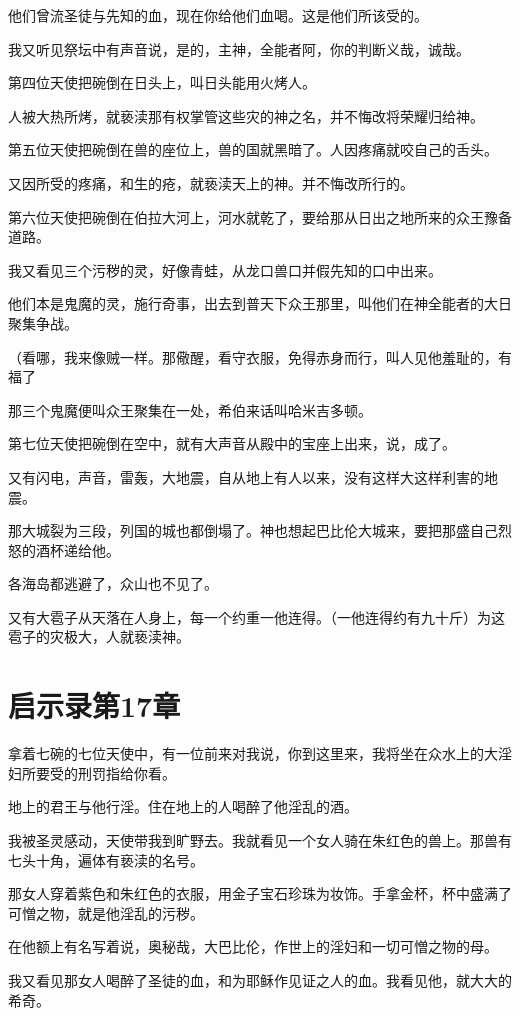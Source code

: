 \documentclass[12pt,oneside]{book}
\begin{document}
他们曾流圣徒与先知的血，现在你给他们血喝。这是他们所该受的。

我又听见祭坛中有声音说，是的，主神，全能者阿，你的判断义哉，诚哉。

第四位天使把碗倒在日头上，叫日头能用火烤人。

人被大热所烤，就亵渎那有权掌管这些灾的神之名，并不悔改将荣耀归给神。

第五位天使把碗倒在兽的座位上，兽的国就黑暗了。人因疼痛就咬自己的舌头。

又因所受的疼痛，和生的疮，就亵渎天上的神。并不悔改所行的。

第六位天使把碗倒在伯拉大河上，河水就乾了，要给那从日出之地所来的众王豫备道路。

我又看见三个污秽的灵，好像青蛙，从龙口兽口并假先知的口中出来。

他们本是鬼魔的灵，施行奇事，出去到普天下众王那里，叫他们在神全能者的大日聚集争战。

（看哪，我来像贼一样。那儆醒，看守衣服，免得赤身而行，叫人见他羞耻的，有福了

那三个鬼魔便叫众王聚集在一处，希伯来话叫哈米吉多顿。

第七位天使把碗倒在空中，就有大声音从殿中的宝座上出来，说，成了。

又有闪电，声音，雷轰，大地震，自从地上有人以来，没有这样大这样利害的地震。

那大城裂为三段，列国的城也都倒塌了。神也想起巴比伦大城来，要把那盛自己烈怒的酒杯递给他。

各海岛都逃避了，众山也不见了。

又有大雹子从天落在人身上，每一个约重一他连得。（一他连得约有九十斤）为这雹子的灾极大，人就亵渎神。

\chapter{启示录第17章}
拿着七碗的七位天使中，有一位前来对我说，你到这里来，我将坐在众水上的大淫妇所要受的刑罚指给你看。

地上的君王与他行淫。住在地上的人喝醉了他淫乱的酒。

我被圣灵感动，天使带我到旷野去。我就看见一个女人骑在朱红色的兽上。那兽有七头十角，遍体有亵渎的名号。

那女人穿着紫色和朱红色的衣服，用金子宝石珍珠为妆饰。手拿金杯，杯中盛满了可憎之物，就是他淫乱的污秽。

在他额上有名写着说，奥秘哉，大巴比伦，作世上的淫妇和一切可憎之物的母。

我又看见那女人喝醉了圣徒的血，和为耶稣作见证之人的血。我看见他，就大大的希奇。
\end{document}
